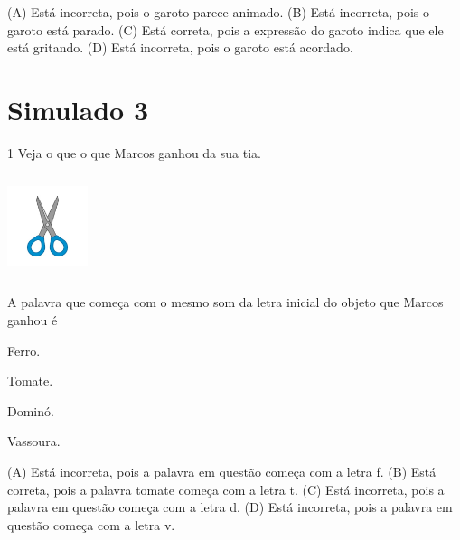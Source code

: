 (A) Está incorreta, pois o garoto parece animado.
(B) Está incorreta, pois o garoto está parado.
(C) Está correta, pois a expressão do garoto indica que ele está gritando.
(D) Está incorreta, pois o garoto está acordado.

\chapter{Simulado 3}

\num{1} Veja o que o que Marcos ganhou da sua tia.

\includegraphics[width=0.92708in,height=1.18125in]{media/image163.jpeg}


A palavra que começa com o mesmo som da letra inicial do objeto que
Marcos ganhou é

\begin{minipage}{.5\textwidth}
\begin{escolha}
\item Ferro.

\item Tomate.

\item Dominó.

\item Vassoura.
\end{escolha}
\end{minipage}

(A) Está incorreta, pois a palavra em questão começa com a letra f.
(B) Está correta, pois a palavra tomate começa com a letra t.
(C) Está incorreta, pois a palavra em questão começa com a letra d.
(D) Está incorreta, pois a palavra em questão começa com a letra v.

